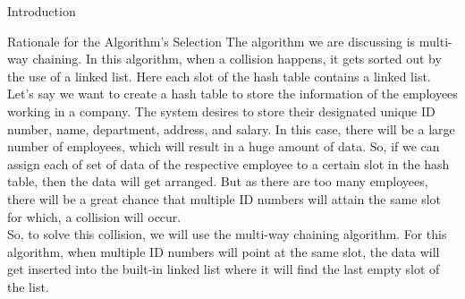 \documentclass[final]{beamer}
\newlength{\colwidth}
\begin{document}
\begin{frame}[t]
\begin{columns}[t]
\begin{column}{\colwidth}
\begin{block}{Introduction}
				
			\end{block}
			\begin{block}{Rationale for the Algorithm's Selection}
			\justifying
            The algorithm we are discussing is multi-way chaining. In this algorithm, when a
collision happens, it gets sorted out by the use of a linked list. Here each slot of the
hash table contains a linked list.\\
Let’s say we want to create a hash table to store the information of the employees working in a company. The system desires to store their designated unique ID number, name, department, address, and salary. In this case, there will be a large number of employees, which will result in a huge
amount of data. So, if we can assign each of set of data of the respective employee to a certain slot in the hash table, then the data will get arranged. But as there are too many
employees, there will be a great chance that multiple ID numbers will attain the same slot for which, a collision will occur.\\
So, to solve this collision, we will use the multi-way chaining algorithm. For this algorithm, when multiple ID numbers will point at the same slot, the data will get
inserted into the built-in linked list where it will find the last empty slot of the list.\\
            
			\end{block}
			

\end{column}
\end{columns}
\end{frame}
\end{document}
